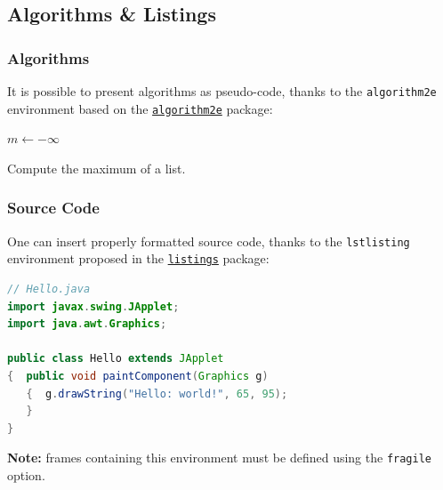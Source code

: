 \documentclass[10pt,    %
    english,            %
    xcolor=table,       %
    envcountsect,        %
    aspectratio=169     %
]{beamer}
\begin{document}
\subsection{Algorithms \& Listings}
\begin{frame}
    \frametitle{Algorithms}
    
    It is possible to present algorithms as pseudo-code, thanks to the \texttt{algorithm2e} environment based on the \href{https://ctan.org/pkg/algorithm2e?lang=en}{\texttt{algorithm2e}} package:
    
    \begin{algorithm2e}[H]
        \DontPrintSemicolon             %
	
	    \BlankLine                      %
	    $m \leftarrow -\infty$\;        %
	
	    \BlankLine
        
    	\caption{Compute the maximum of a list.}
        \label{alg:max}
    \end{algorithm2e}
\end{frame}

\begin{frame}[fragile]
    \frametitle{Source Code}
    \label{frm:sourcecode}
    
    One can insert properly formatted source code, thanks to the \texttt{lstlisting} environment proposed in the \href{https://ctan.org/pkg/listings?lang=en}{\texttt{listings}} package:
    
    \begin{lstlisting}[language=Java,caption={Hello World Java applet.},captionpos=b,label={lst:hello}]
// Hello.java
import javax.swing.JApplet;
import java.awt.Graphics;

public class Hello extends JApplet
{  public void paintComponent(Graphics g) 
   {  g.drawString("Hello: world!", 65, 95);
   }    
}
    \end{lstlisting}
    
    \vspace{0.25cm}
    \textbf{Note:} frames containing this environment must be defined using the \texttt{fragile} option.
\end{frame}
\end{document}
